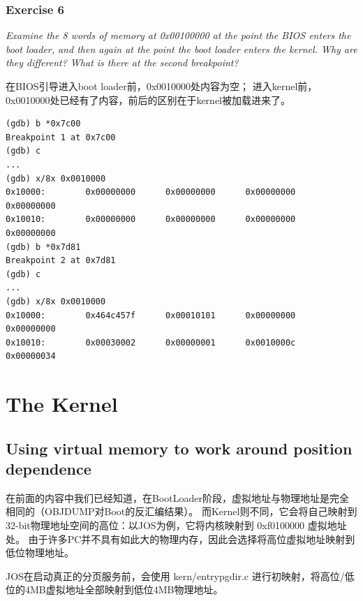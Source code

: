 \documentclass[12pt, letterpaper]{report}
\begin{document}
\subsection{Exercise 6}
\textsl{Examine the 8 words of memory at 0x00100000 at the point the BIOS enters the boot loader, 
        and then again at the point the boot loader enters the kernel. Why are they different? 
        What is there at the second breakpoint?} \par 
\quad \par
在BIOS引导进入boot loader前，0x0010000处内容为空；
进入kernel前，0x0010000处已经有了内容，前后的区别在于kernel被加载进来了。

\lstset{style=AssemblyStyle}
\setmainfont{Consolas}
\begin{lstlisting}
(gdb) b *0x7c00
Breakpoint 1 at 0x7c00
(gdb) c
...  
(gdb) x/8x 0x0010000
0x10000:        0x00000000      0x00000000      0x00000000      0x00000000
0x10010:        0x00000000      0x00000000      0x00000000      0x00000000
(gdb) b *0x7d81
Breakpoint 2 at 0x7d81
(gdb) c
...
(gdb) x/8x 0x0010000
0x10000:        0x464c457f      0x00010101      0x00000000      0x00000000
0x10010:        0x00030002      0x00000001      0x0010000c      0x00000034
\end{lstlisting}
\setmainfont{Times New Roman}

\chapter[\Large The Kernel]{The Kernel}
\section[\large Using virtual memory to work around position dependence]{Using virtual memory to work around position dependence}
在前面的内容中我们已经知道，在BootLoader阶段，虚拟地址与物理地址是完全相同的（OBJDUMP对Boot的反汇编结果）。
而Kernel则不同，它会将自己映射到32-bit物理地址空间的高位：以JOS为例，它将内核映射到 0xf0100000 虚拟地址处。
由于许多PC并不具有如此大的物理内存，因此会选择将高位虚拟地址映射到低位物理地址。 \par 
JOS在启动真正的分页服务前，会使用 kern/entrypgdir.c 进行初映射，将高位/低位的4MB虚拟地址全部映射到低位4MB物理地址。
\end{document}
